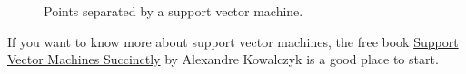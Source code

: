 \begin{figure}[!th]
\caption{Points separated by a support vector machine.}
\label{fig:strange-data.pdf}
\end{figure}

If you want to know more about support vector machines, the free book
\href{https://www.syncfusion.com/ebooks/support_vector_machines_succinctly}{Support Vector Machines Succinctly}
by Alexandre Kowalczyk \cite{kowalczyk:2017} is a good place to start.


 
